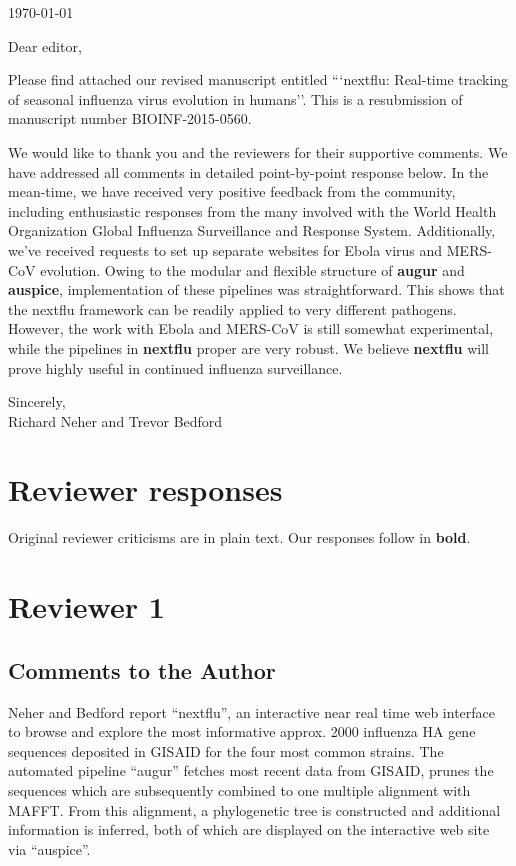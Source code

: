 \documentclass[11pt,oneside,letterpaper]{article}
\newcommand{\augur}{\textbf{augur}}
\newcommand{\auspice}{\textbf{auspice}}
\newcommand{\nextflu}{\textbf{nextflu}}
\begin{document}

\today

\vspace{1cm}

Dear editor,

Please find attached our revised manuscript entitled ```nextflu: Real-time tracking of seasonal influenza virus evolution in humans''.  This is a resubmission of manuscript number BIOINF-2015-0560.

We would like to thank you and the reviewers for their supportive comments. We have addressed all comments in detailed point-by-point response below. In the mean-time, we have received very positive feedback from the community, including enthusiastic responses from the many involved with the World Health Organization Global Influenza Surveillance and Response System. Additionally, we've received requests to set up separate websites for Ebola virus and MERS-CoV evolution. Owing to the modular and flexible structure of \augur{} and \auspice{}, implementation of these pipelines was straightforward. This shows that the nextflu framework can be readily applied to very different pathogens. However, the work with Ebola and MERS-CoV is still somewhat experimental, while the pipelines in \nextflu{} proper are very robust. We believe \nextflu{} will prove highly useful in continued influenza surveillance.

Sincerely,\\
Richard Neher and Trevor Bedford

\restoregeometry

\newpage

\section*{Reviewer responses}

Original reviewer criticisms are in plain text.  Our responses follow in \textbf{bold}.  


\section*{Reviewer 1}

\subsection*{Comments to the Author}

Neher and Bedford report ``nextflu'', an interactive near real time web interface to browse and explore the most informative approx. 2000 influenza HA gene sequences deposited in GISAID for the four most common strains. The automated pipeline ``augur'' fetches most recent data from GISAID, prunes the sequences which are subsequently combined to one multiple alignment with MAFFT. From this alignment, a phylogenetic tree is constructed and additional information is inferred, both of which are displayed on the interactive web site via ``auspice''.
\end{document}
